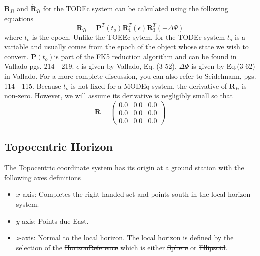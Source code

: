 {$\mathbf{R}_{Ii}$ and $ \dot{\mathbf{R}}_{Ii}$ for the TODEc
system can be calculated using the following equations
%
\begin{equation}
      \mathbf{R}_{Ii} = \mathbf{P}^T(t_o)\mathbf{R}_1^T(\bar{\epsilon})\mathbf{R}_3^T(-\Delta \Psi)
\end{equation}
%
where $t_o$ is the epoch.  Unlike the TOEEc sytem, for the TODEc
system $t_o$ is a variable and usually comes from the epoch of the
object whose state we wish to convert.  $\mathbf{P}(t_o)$is part
of the FK5 reduction algorithm and can be found in Vallado pgs.
214 - 219.   $\bar{\epsilon}$ is given by Vallado\cite{vallado2},
Eq. (3-52).  $\Delta \Psi$ is given by Eq.(3-62) in
Vallado\cite{vallado2}.  For a more complete discussion, you can
also refer to Seidelmann\cite{seidelmann}, pgs. 114 - 115. Because
$t_o$ is not fixed for a MODEq system, the derivative of
$\mathbf{R}_{Ii}$ is non-zero. However, we will assume its
derivative is negligibly small so that
%
\begin{equation}
  \dot{\mathbf{R}} =   \begin{pmatrix}
     0.0 & 0.0 & 0.0\\
     0.0 & 0.0 & 0.0\\
     0.0 & 0.0 & 0.0
     \end{pmatrix}
\end{equation}

\subsection{Topocentric Horizon}  \label{Sec:TopocentricHorizon} 


The Topocentric coordinate system has its origin at a ground station
with the following axes definitions
\begin{itemize}
\item $x$-axis:  Completes the right handed set and points south in
the local horizon system.
%
\item $y$-axis:  Points due East.
%
\item $z$-axis:  Normal to the local horizon.  The local horizon is
defined by the selection of the \st{HorizonReference} which is
either \st{Sphere} or \st{Ellipsoid}.
\end{itemize}

}
